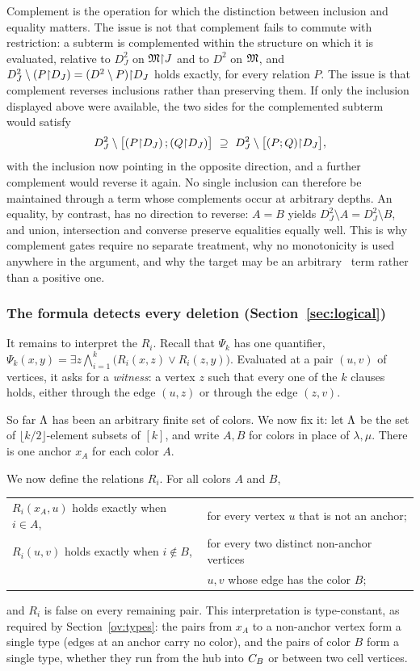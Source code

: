 Complement is the operation for which the distinction between inclusion and
equality matters. The issue is not that complement fails to commute with
restriction: a subterm is complemented within the structure on which it is
evaluated, relative to $D_J^2$ on $\mathfrak M\mathord{\restriction} J$ and to $D^2$ on $\mathfrak M$, and
$D_J^2\setminus(P\mathord{\restriction} D_J)=(D^2\setminus P)\mathord{\restriction} D_J$ holds exactly, for
every relation $P$. The issue is that complement reverses inclusions rather
than preserving them. If only the inclusion displayed above were available,
the two sides for the complemented subterm would satisfy
\[
 D_J^2\setminus\bigl[(P\mathord{\restriction} D_J)\,;(Q\mathord{\restriction} D_J)\bigr]
 \ \supseteq\
 D_J^2\setminus\bigl[(P;Q)\mathord{\restriction} D_J\bigr],
\]
with the inclusion now pointing in the opposite direction, and a further
complement would reverse it again. No single inclusion can therefore be
maintained through a term whose complements occur at arbitrary depths. An
equality, by contrast, has no direction to reverse: $A=B$ yields
$D_J^2\setminus A=D_J^2\setminus B$, and union, intersection and converse
preserve equalities equally well. This is why complement gates require no
separate treatment, why no monotonicity is used anywhere in the argument,
and why the target may be an arbitrary \CoR\ term rather than a positive
one.

\subsubsection{The formula detects every deletion (Section~\ref{sec:logical})}\label{ov:formula}
It remains to interpret the $R_i$. Recall that $\Psi_k$ has one quantifier,
$\Psi_k(x,y)=\exists z\bigwedge_{i=1}^k\bigl(R_i(x,z)\lor R_i(z,y)\bigr)$.
Evaluated at a pair $(u,v)$ of vertices, it asks for a \emph{witness}: a
vertex $z$ such that every one of the $k$ clauses holds, either through the
edge $(u,z)$ or through the edge $(z,v)$.

So far $\Lambda$ has been an arbitrary finite set of colors. We now fix it: let
$\Lambda$ be the set of $\lfloor k/2\rfloor$-element subsets of $[k]$, and
write $A,B$ for colors in place of $\lambda,\mu$. There is one anchor $x_A$
for each color $A$.

We now define the relations $R_i$. For all colors $A$ and $B$,
\begin{center}
\begin{tabular}{@{}l@{\quad}l@{}}
$R_i(x_A,u)$ holds exactly when $i\in A$,&for every vertex $u$ that is not
 an anchor;\\
$R_i(u,v)$ holds exactly when $i\notin B$,&for every two distinct non-anchor
 vertices\\
&$u,v$ whose edge has the color $B$;\\
\end{tabular}
\end{center}
and $R_i$ is false on every remaining pair. This interpretation is
type-constant, as required by Section~\ref{ov:types}: the pairs from $x_A$
to a non-anchor vertex form a single type (edges at an anchor carry no
color), and the pairs of color $B$ form a single type, whether they run
from the hub into $C_{B}$ or between two cell vertices.

